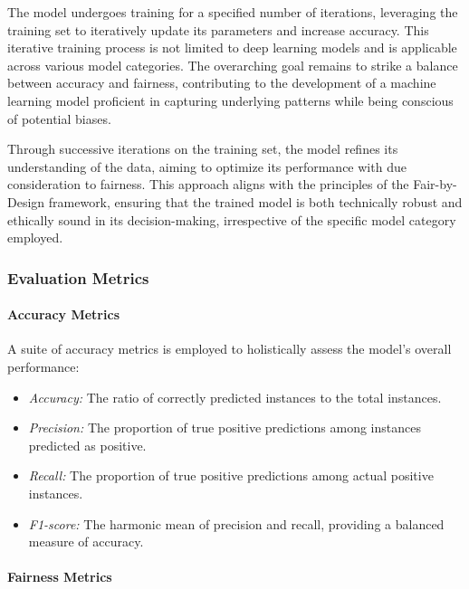 The model undergoes training for a specified number of iterations, leveraging the training set to iteratively update its parameters and increase accuracy. This iterative training process is not limited to deep learning models and is applicable across various model categories. The overarching goal remains to strike a balance between accuracy and fairness, contributing to the development of a machine learning model proficient in capturing underlying patterns while being conscious of potential biases.

Through successive iterations on the training set, the model refines its understanding of the data, aiming to optimize its performance with due consideration to fairness. This approach aligns with the principles of the Fair-by-Design framework, ensuring that the trained model is both technically robust and ethically sound in its decision-making, irrespective of the specific model category employed.

\subsubsection{Evaluation Metrics}

\paragraph{Accuracy Metrics}

A suite of accuracy metrics is employed to holistically assess the model's overall performance:

\begin{itemize}
    \item \emph{Accuracy:} The ratio of correctly predicted instances to the total instances.
    
    \item \emph{Precision:} The proportion of true positive predictions among instances predicted as positive.
    
    \item \emph{Recall:} The proportion of true positive predictions among actual positive instances.
    
    \item \emph{F1-score:} The harmonic mean of precision and recall, providing a balanced measure of accuracy.
\end{itemize}

\paragraph{Fairness Metrics}

